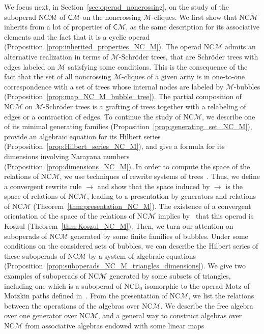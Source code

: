 \documentclass[10pt,reqno]{amsart}
\numberwithin{equation}{subsection}
\newcommand{\Mca}{\mathcal{M}}
\newcommand{\Dbb}{\mathbb{D}}
\newcommand{\Cli}{\mathsf{C}}
\newcommand{\NC}{\mathrm{NC}}
\newcommand{\Motz}{\mathrm{Motz}}
\newcommand{\Rew}{\to}
\begin{document}
We focus next, in Section~\ref{sec:operad_noncrossing}, on the study of
the suboperad $\NC\Mca$ of $\Cli\Mca$ on the noncrossing $\Mca$-cliques.
We first show that $\NC\Mca$ inherits from a lot of properties of
$\Cli\Mca$, as the same description for its associative elements and the
fact that it is a cyclic operad
(Proposition~\ref{prop:inherited_properties_NC_M}). The operad $\NC\Mca$
admits an alternative realization in terms of $\Mca$-Schröder trees,
that are Schröder trees with edges labeled on $\Mca$ satisfying some
conditions. This is the consequence of the fact that the set of all
noncrossing $\Mca$-cliques of a given arity is in one-to-one
correspondence with a set of trees whose internal nodes are labeled by
$\Mca$-bubbles (Proposition~\ref{prop:map_NC_M_bubble_tree}). The
partial composition of $\NC\Mca$ on $\Mca$-Schröder trees is a grafting
of trees together with a relabeling of edges or a contraction of edges.
To continue the study of $\NC\Mca$, we describe one of its minimal
generating families (Proposition~\ref{prop:generating_set_NC_M}),
provide an algebraic equation for its Hilbert series
(Proposition~\ref{prop:Hilbert_series_NC_M}), and give a formula for its
dimensions involving Narayana numbers~\cite{Nar55}
(Proposition~\ref{prop:dimensions_NC_M}). In order to compute the space
of the relations of $\NC\Mca$, we use techniques of rewrite systems of
trees~\cite{BN98}. Thus, we define a convergent rewrite rule $\Rew$ and
show that the space induced by $\Rew$ is the space of relations of
$\NC\Mca$, leading to a presentation by generators and relations of
$\NC\Mca$ (Theorem~\ref{thm:presentation_NC_M}). The existence of a
convergent orientation of the space of the relations of $\NC\Mca$
implies by~\cite{Hof10} that this operad is Koszul
(Theorem~\ref{thm:Koszul_NC_M}). Then, we turn our attention on
suboperads of $\NC\Mca$ generated by some finite families of
bubbles. Under some conditions on the considered sets of bubbles, we can
describe the Hilbert series of these suboperads of $\NC\Mca$ by a system
of algebraic equations
(Proposition~\ref{prop:suboperads_NC_M_triangles_dimensions}). We give
two examples of suboperads of $\NC\Mca$ generated by some subsets of
triangles, including one which is a suboperad of $\NC\Dbb_0$ isomorphic
to the operad $\Motz$ of Motzkin paths defined in~\cite{Gir15}. From the
presentation of $\NC\Mca$, we list the relations between the operations
of the algebras over $\NC\Mca$. We describe the free algebra over one
generator over $\NC\Mca$, and a general way to construct algebras over
$\NC\Mca$ from associative algebras endowed with some linear maps
\end{document}
